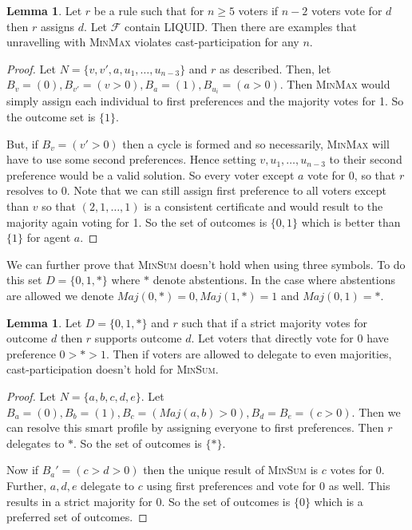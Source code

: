 \documentclass[11pt,a4paper, titlepage]{article}
\theoremstyle{definition}
\newtheorem{lemma}[theorem]{Lemma}
\begin{document}
\begin{lemma}
    Let $r$ be a rule such that for $n \geq 5$ voters if $n-2$ voters vote for $d$ then $r$ assigns $d$. Let $\mathcal{F}$ contain LIQUID. Then there are examples that unravelling with \textsc{MinMax} violates cast-participation for any $n$.
\end{lemma}

\begin{proof}
    Let $N = \{v, v', a, u_1, \ldots, u_{n-3}\}$ and $r$ as described. Then, let $B_v = (0), B_{v'} = (v > 0), B_a = (1), B_{u_i} = (a > 0)$. Then \textsc{MinMax} would simply assign each individual to first preferences and the majority votes for 1. So the outcome set is $\{1\}$.

    But, if $B_v = (v' > 0)$ then a cycle is formed and so necessarily, \textsc{MinMax} will have to use some second preferences. Hence setting $v, u_1, \ldots, u_{n-3}$ to their second preference would be a valid solution. So every voter except $a$ vote for $0$, so that $r$ resolves to $0$. 
    Note that we can still assign first preference to all voters except than $v$ so that $(2, 1, \ldots, 1)$ is a consistent certificate and would result to the majority again voting for 1. So the set of outcomes is $\{0, 1\}$ which is better than $\{1\}$ for agent $a$.
\end{proof}

We can further prove that \textsc{MinSum} doesn't hold when using three symbols. To do this set $D = \{0, 1, *\}$ where $*$ denote abstentions.
In the case where abstentions are allowed we denote $\mathit{Maj}(0, *) = 0, \mathit{Maj}(1, *) = 1$ and $\mathit{Maj}(0, 1) = *$.

\begin{lemma}
    Let $D = \{0, 1, *\}$ and $r$ such that if a strict majority votes for outcome $d$ then $r$ supports outcome $d$. Let voters that directly vote for $0$ have preference $0 > * > 1$. Then if voters are allowed to delegate to even majorities, cast-participation doesn't hold for \textsc{MinSum}. 
\end{lemma}

\begin{proof}
    Let $N = \{a, b, c, d, e\}$. Let $B_a = (0), B_b = (1), B_c = (\mathit{Maj}(a, b) > 0), B_d = B_e = (c > 0)$. Then we can resolve this smart profile by assigning everyone to first preferences. Then $r$ delegates to $*$. So the set of outcomes is $\{*\}$.
    
    Now if $B_a' = (c > d > 0)$ then the unique result of \textsc{MinSum} is $c$ votes for $0$. Further, $a, d, e$ delegate to $c$ using first preferences and vote for $0$ as well. This results in a strict majority for $0$. So the set of outcomes is $\{0\}$ which is a preferred set of outcomes.
\end{proof}
\end{document}

